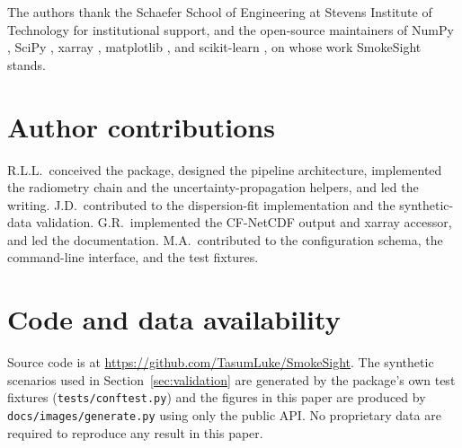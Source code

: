 \documentclass[11pt, a4paper]{article}
\begin{document}
The authors thank the Schaefer School of Engineering at Stevens
Institute of Technology for institutional support, and the open-source
maintainers of NumPy \cite{harris2020array}, SciPy
\cite{virtanen2020scipy}, xarray \cite{hoyer2017xarray}, matplotlib
\cite{hunter2007matplotlib}, and scikit-learn
\cite{pedregosa2011scikit}, on whose work SmokeSight stands.

\section*{Author contributions}

R.L.L.\ conceived the package, designed the pipeline architecture,
implemented the radiometry chain and the uncertainty-propagation
helpers, and led the writing. J.D.\ contributed to the dispersion-fit
implementation and the synthetic-data validation. G.R.\ implemented the
CF-NetCDF output and xarray accessor, and led the documentation. M.A.\
contributed to the configuration schema, the command-line interface,
and the test fixtures.

\section*{Code and data availability}

Source code is at \url{https://github.com/TasumLuke/SmokeSight}.
The synthetic scenarios used in Section~\ref{sec:validation} are
generated by the package's own test fixtures (\texttt{tests/conftest.py})
and the figures in this paper are produced by
\texttt{docs/images/generate.py} using only the public API. No
proprietary data are required to reproduce any result in this paper.

\printbibliography
\end{document}
